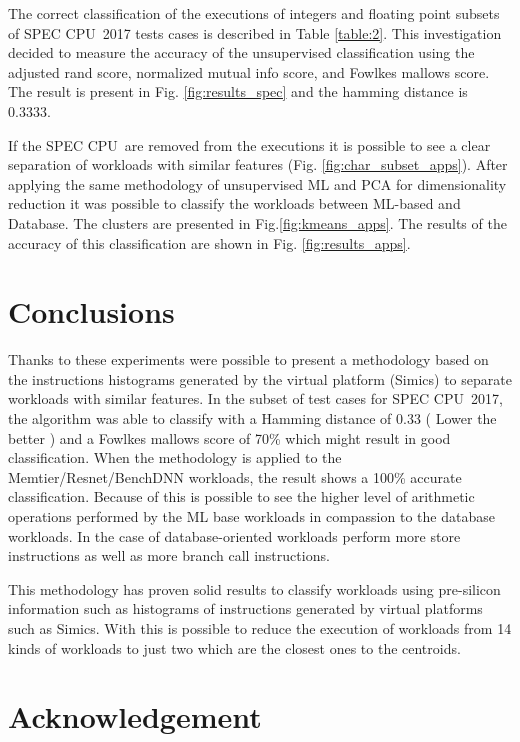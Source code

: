 \documentclass[]{PhDEngScITESO-R}
\begin{document}
The correct classification of the executions of integers and floating point subsets of SPEC CPU\textregistered\ 2017 tests cases is described in Table \ref{table:2}. This investigation decided to measure the accuracy of the unsupervised classification using the adjusted rand score, normalized mutual info score, and Fowlkes mallows score. The result is present in Fig. \ref{fig:results_spec} and the hamming distance is 0.3333. 

If  the SPEC CPU\textregistered\ are removed from the executions it is possible to see a clear separation of workloads with similar features (Fig. \ref{fig:char_subset_apps}). After applying the same methodology of unsupervised ML and PCA for dimensionality reduction it was possible to classify the workloads between ML-based and Database. The clusters are presented in Fig.\ref{fig:kmeans_apps}. The results of the accuracy of this classification are shown in Fig. \ref{fig:results_apps}. 

\section{Conclusions}

Thanks to these experiments were possible to present a methodology based on the instructions histograms generated by the virtual platform (Simics) to separate workloads with similar features. In the subset of test cases for SPEC CPU\textregistered\ 2017, the algorithm was able to classify with a Hamming distance of 0.33 ( Lower the better ) and a Fowlkes mallows score of 70\% which might result in good classification. When the methodology is applied to the Memtier/Resnet/BenchDNN workloads, the result shows a 100\% accurate classification.  Because of this is possible to see the higher level of arithmetic operations performed by the ML base workloads in compassion to the database workloads. In the case of database-oriented workloads perform more store instructions as well as more branch call instructions. 

This methodology has proven solid results to classify workloads using pre-silicon information such as histograms of instructions generated by virtual platforms such as Simics. With this is possible to reduce the execution of workloads from 14 kinds of workloads to just two which are the closest ones to the centroids.  

\section{Acknowledgement}
\end{document}
